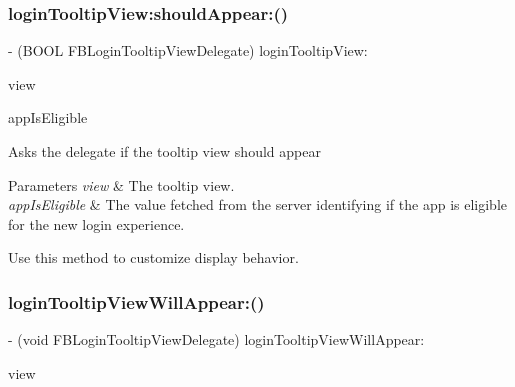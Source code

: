 \subsubsection{\texorpdfstring{login\+Tooltip\+View\+:should\+Appear\+:()}{loginTooltipView:shouldAppear:()}\hspace{0.1cm}{\footnotesize\ttfamily [5/5]}}
{\footnotesize\ttfamily -\/ (B\+O\+OL F\+B\+Login\+Tooltip\+View\+Delegate) login\+Tooltip\+View\+: \begin{DoxyParamCaption}\item[{(\hyperlink{interfaceFBLoginTooltipView}{F\+B\+Login\+Tooltip\+View} $\ast$)}]{view }\item[{shouldAppear:(B\+O\+OL)}]{app\+Is\+Eligible }\end{DoxyParamCaption}\hspace{0.3cm}{\ttfamily [optional]}}

Asks the delegate if the tooltip view should appear


\begin{DoxyParams}{Parameters}
{\em view} & The tooltip view. \\
\hline
{\em app\+Is\+Eligible} & The value fetched from the server identifying if the app is eligible for the new login experience.\\
\hline
\end{DoxyParams}
Use this method to customize display behavior. \mbox{\label{protocolFBLoginTooltipViewDelegate_01-p_a0d89efb9ebc19a9b47dd4116d5130631}} 
\subsubsection{\texorpdfstring{login\+Tooltip\+View\+Will\+Appear\+:()}{loginTooltipViewWillAppear:()}\hspace{0.1cm}{\footnotesize\ttfamily [1/5]}}
{\footnotesize\ttfamily -\/ (void F\+B\+Login\+Tooltip\+View\+Delegate) login\+Tooltip\+View\+Will\+Appear\+: \begin{DoxyParamCaption}\item[{(\hyperlink{interfaceFBLoginTooltipView}{F\+B\+Login\+Tooltip\+View} $\ast$)}]{view }\end{DoxyParamCaption}\hspace{0.3cm}{\ttfamily [optional]}}

